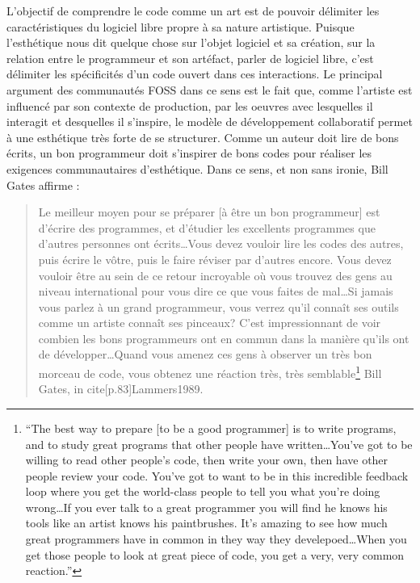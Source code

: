 L'objectif de comprendre le code comme un art est de pouvoir délimiter les caractéristiques du logiciel libre propre à sa nature artistique. Puisque l'esthétique nous dit quelque chose sur l'objet logiciel et sa création, sur la relation entre le programmeur et son artéfact, parler de logiciel libre, c'est délimiter les spécificités d'un code ouvert dans ces interactions. Le principal argument des communautés FOSS dans ce sens est le fait que, comme l'artiste est influencé par son contexte de production, par les oeuvres avec lesquelles il interagit et desquelles il s'inspire, le modèle de développement collaboratif permet à une esthétique très forte de se structurer. Comme un auteur doit lire de bons écrits, un bon programmeur doit s'inspirer de bons codes pour réaliser les exigences communautaires d'esthétique. Dans ce sens, et non sans ironie, Bill Gates affirme :

\begin{quote}
Le meilleur moyen pour se préparer [à être un bon programmeur] est d'écrire des programmes, et d'étudier les excellents programmes que d'autres personnes ont écrits\ldots Vous devez vouloir lire les codes des autres, puis écrire le vôtre, puis le faire réviser par d'autres encore. Vous devez vouloir être au sein de ce retour incroyable où vous trouvez des gens au niveau international pour vous dire ce que vous faites de mal\ldots Si jamais vous parlez à un grand programmeur, vous verrez qu'il connaît ses outils comme un artiste connaît ses pinceaux? C'est impressionnant de voir combien les bons programmeurs ont en commun dans la manière qu'ils ont de développer\ldots Quand vous amenez ces gens à observer un très bon morceau de code, vous obtenez une réaction très, très semblable\footnote{“The best way to prepare [to be a good programmer] is to write programs, and to study great programs that other people have written\ldots You've got to be willing to read other people's code, then write your own, then have other people review your code.  You've got to want to be in this incredible feedback loop where you get the world-class people to tell you what you're doing wrong\ldots If you ever talk to a great programmer you will find he knows his tools like an artist knows his paintbrushes. It's amazing to see how much great programmers have in common in they way they develepoed\ldots When you get those people to look at great piece of code, you get a very, very common reaction.”} Bill Gates, in cite[p.83]{Lammers1989}.
\end{quote}

